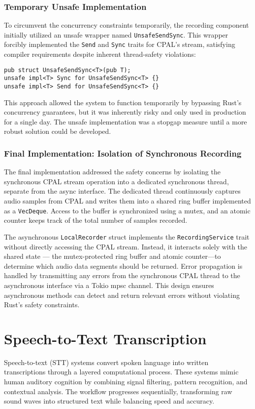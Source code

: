 \subsubsection{Temporary Unsafe Implementation}
To circumvent the concurrency constraints temporarily, the recording component initially utilized an unsafe wrapper named \texttt{UnsafeSendSync}.
This wrapper forcibly implemented the \texttt{Send} and \texttt{Sync} traits for CPAL's stream, satisfying compiler requirements despite inherent thread-safety violations:

\begin{verbatim}
pub struct UnsafeSendSync<T>(pub T);
unsafe impl<T> Sync for UnsafeSendSync<T> {}
unsafe impl<T> Send for UnsafeSendSync<T> {}
\end{verbatim}

This approach allowed the system to function temporarily by bypassing Rust's concurrency guarantees, but it was inherently risky and only used in production for a single day. 
The unsafe implementation was a stopgap measure until a more robust solution could be developed.

\subsubsection{Final Implementation: Isolation of Synchronous Recording}
The final implementation addressed the safety concerns by isolating the synchronous CPAL stream operation into a dedicated synchronous thread, separate from the async interface.
The dedicated thread continuously captures audio samples from CPAL and writes them into a shared ring buffer implemented as a \texttt{VecDeque}.
Access to the buffer is synchronized using a mutex, and an atomic counter keeps track of the total number of samples recorded.

The asynchronous \texttt{LocalRecorder} struct implements the \texttt{RecordingService} trait without directly accessing the CPAL stream.
Instead, it interacts solely with the shared state --- the mutex-protected ring buffer and atomic counter—to determine which audio data segments should be returned.
Error propagation is handled by transmitting any errors from the synchronous CPAL thread to the asynchronous interface via a Tokio mpsc channel.
This design ensures asynchronous methods can detect and return relevant errors without violating Rust's safety constraints.

\section{Speech-to-Text Transcription}
Speech-to-text (STT) systems convert spoken language into written transcriptions through a layered computational process.
These systems mimic human auditory cognition by combining signal filtering, pattern recognition, and contextual analysis.
The workflow progresses sequentially, transforming raw sound waves into structured text while balancing speed and accuracy.

